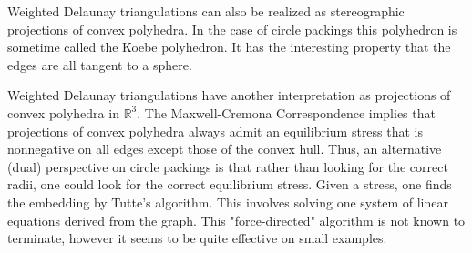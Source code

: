 \documentclass[english]{article}
\newcommand{\R}{\mathbb{R}}
\begin{document}
Weighted Delaunay triangulations can also be realized as stereographic projections of convex polyhedra. In the case of circle packings this polyhedron is sometime called the Koebe polyhedron. It has the interesting property that the edges are all tangent to a sphere.

    Weighted Delaunay triangulations have another interpretation as projections of convex polyhedra in $\R^3$. The Maxwell-Cremona Correspondence implies that projections of convex polyhedra always admit an equilibrium stress that is nonnegative on all edges except those of the convex hull. Thus, an alternative (dual) perspective on circle packings is that rather than looking for the correct radii, one could look for the correct equilibrium stress. Given a stress, one finds the embedding by Tutte's algorithm. This involves solving one system of linear equations derived from the graph. This "force-directed" algorithm is not known to terminate, however it seems to be quite effective on small examples. 


\end{document}
